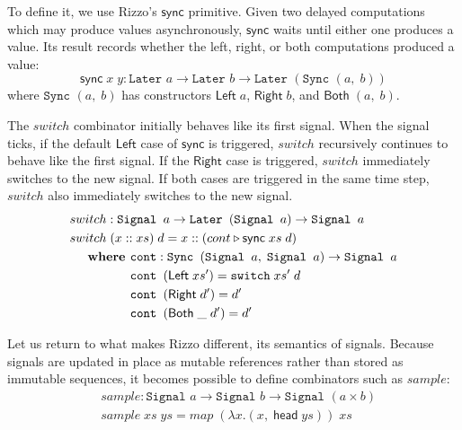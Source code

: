 To define it, we use Rizzo's $\mathsf{sync}$ primitive. Given two delayed computations which may produce values asynchronously, $\mathsf{sync}$ waits until either one produces a value. 
Its result records whether the left, right, or both computations produced a value:
\[
\mathsf{sync} \;x\;y :
\texttt{Later }a \to \texttt{Later }b \to \texttt{Later }(\texttt{Sync }(a,\;b))
\]
where $\texttt{Sync }(a,\;b)$ has constructors
$\mathsf{Left}\;a$, $\mathsf{Right}\;b$, and $\mathsf{Both}\;(a,\;b)$.

The $switch$ combinator initially behaves like its first signal. When the signal ticks, if the default $\mathsf{Left}$ case of $\mathsf{sync}$ is triggered, $switch$ recursively continues to behave like the first signal. If the $\mathsf{Right}$ case is triggered, $switch$ immediately switches to the new signal. If both cases are triggered in the same time step, $switch$ also immediately switches to the new signal.
\begin{align*}
&switch : \texttt{Signal }a \rightarrow \texttt{Later }(\texttt{Signal }a) \rightarrow \texttt{Signal }a \\
&switch \; (x :: xs) \; d = x :: (cont \triangleright \mathsf{sync} \; xs \; d) \\
&\hspace{5mm}\textbf{where }
\begin{aligned}[t]
    &\texttt{cont} : \texttt{Sync }( \texttt{Signal } a,\; \texttt{Signal } a) \rightarrow \texttt{Signal } a \\
    &\texttt{cont } (\mathsf{Left}\; xs') = \texttt{switch} \; xs' \; d \\
    &\texttt{cont } (\mathsf{Right}\; d') = d' \\
    &\texttt{cont } (\mathsf{Both}\; \_ \; d') = d' \\
\end{aligned}
\end{align*}

Let us return to what makes Rizzo different, its semantics of signals. 
Because signals are updated in place as mutable references rather than stored as immutable sequences, it becomes possible to define combinators such as $sample$:
\begin{align*}
&sample : \texttt{Signal }a \rightarrow \texttt{Signal }b \rightarrow \texttt{Signal } (a \times b) \\
&sample \; xs \; ys = map \; (\lambda x. (x, \; \mathsf{head} \; ys)) \; xs  
\end{align*}

